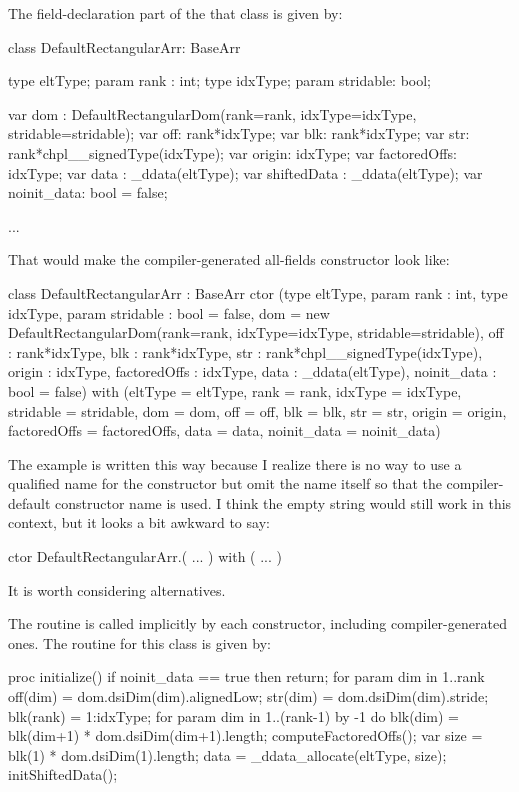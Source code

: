 The field-declaration part of the that class is given by:
\begin{chapel}
  class DefaultRectangularArr: BaseArr {
    type eltType;
    param rank : int;
    type idxType;
    param stridable: bool;
  
    var dom : DefaultRectangularDom(rank=rank, idxType=idxType,
                                           stridable=stridable);
    var off: rank*idxType;
    var blk: rank*idxType;
    var str: rank*chpl__signedType(idxType);
    var origin: idxType;
    var factoredOffs: idxType;
    var data : _ddata(eltType);
    var shiftedData : _ddata(eltType);
    var noinit_data: bool = false;

    ...
  }
\end{chapel}
That would make the compiler-generated all-fields constructor look like:
\begin{chapel}
class DefaultRectangularArr : BaseArr {
  ctor (type eltType,
        param rank : int,
        type idxType,
        param stridable : bool = false,
        dom = new DefaultRectangularDom(rank=rank, idxType=idxType,
                                         stridable=stridable),
        off : rank*idxType,
        blk : rank*idxType,
        str : rank*chpl__signedType(idxType),
        origin : idxType,
        factoredOffs : idxType,
        data : _ddata(eltType),
        noinit_data : bool = false)
    with (eltType = eltType,
          rank = rank,
          idxType = idxType,
          stridable = stridable,
          dom = dom,
          off = off,
          blk = blk,
          str = str,
          origin = origin,
          factoredOffs = factoredOffs,
          data = data,
          noinit_data = noinit_data) {}
}
\end{chapel}

\begin{openissue}
The example is written this way because I realize there is no way to use a qualified name
for the constructor but omit the name itself so that the compiler-default constructor name
is used.  I think the empty string would still work in this context, but it looks a bit
awkward to say:
\begin{chapel}
ctor DefaultRectangularArr.( ... ) with ( ... ) {}
\end{chapel}
It is worth considering alternatives.
\end{openissue}

The  routine is called implicitly by each constructor, including
compiler-generated ones.
The  routine for this class is given by:
\begin{chapel}
    proc initialize() {
      if noinit_data == true then return;
      for param dim in 1..rank {
        off(dim) = dom.dsiDim(dim).alignedLow;
        str(dim) = dom.dsiDim(dim).stride;
      }
      blk(rank) = 1:idxType;
      for param dim in 1..(rank-1) by -1 do
        blk(dim) = blk(dim+1) * dom.dsiDim(dim+1).length;
      computeFactoredOffs();
      var size = blk(1) * dom.dsiDim(1).length;
      data = _ddata_allocate(eltType, size);
      initShiftedData();
    }
\end{chapel}



